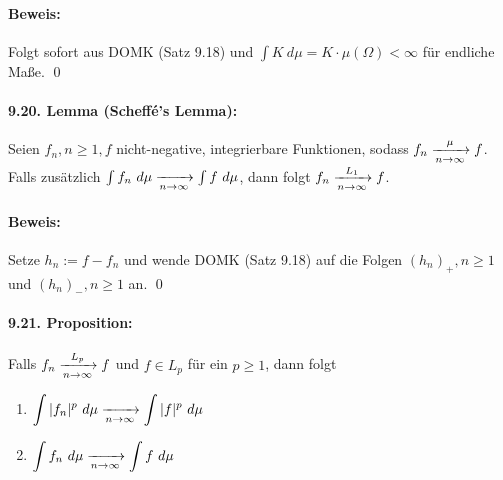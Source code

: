 \documentclass[11pt]{report}
\begin{document}
\paragraph{Beweis:}Folgt sofort aus DOMK (Satz 9.18) und $\int K\ d\mu=K\cdot\mu(\Omega)<\infty$ f\"ur endliche Ma\ss{}e. \qed

\paragraph{9.20. Lemma (Scheff\'e's Lemma):}Seien $f_n,n\geq1,f$ nicht-negative, integrierbare Funktionen, sodass $f_n\nto{\mu}{n\to\infty}f$. Falls zus\"atzlich $\int f_n\ d\mu\nto{}{n\to\infty}\int f\ d\mu$, dann folgt $f_n\nto{L_1}{n\to\infty}f$.

\paragraph{Beweis:}Setze $h_n:=f-f_n$ und wende DOMK (Satz 9.18) auf die Folgen $(h_n)_+,n\geq1$ und $(h_n)_-,n\geq1$ an. \qed

\paragraph{9.21. Proposition:}Falls $f_n\nto{L_p}{n\to\infty}f$ und $f\in L_p$ f\"ur ein $p\geq1$, dann folgt
\begin{enumerate}[label=(\roman*)]
    \item $\displaystyle\int|f_n|^p\ d\mu\nto{}{n\to\infty}\int|f|^p\ d\mu$
    \item $\displaystyle\int f_n\ d\mu\nto{}{n\to\infty}\int f\ d\mu$
\end{enumerate} 
\end{document}
